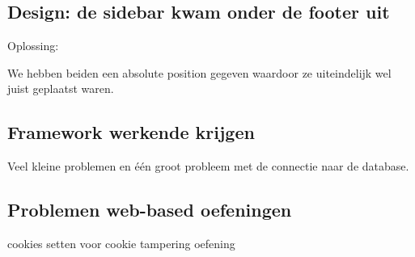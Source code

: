 \subsection{Design: de sidebar kwam onder de footer uit}
Oplossing:

We hebben beiden een absolute position gegeven waardoor ze uiteindelijk wel juist geplaatst waren.

\subsection{Framework werkende krijgen}
Veel kleine problemen en één groot probleem met de connectie naar de database.

\subsection{Problemen web-based oefeningen}
cookies setten voor cookie tampering oefening 